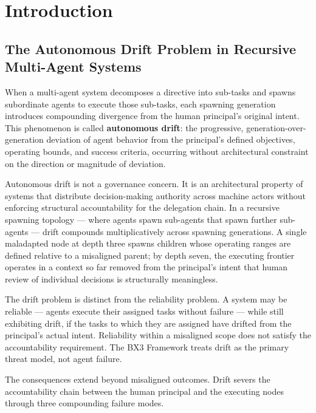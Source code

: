 \section{Introduction}\label{sec:introduction}

\subsection{The Autonomous Drift Problem in Recursive Multi-Agent Systems}

When a multi-agent system decomposes a directive into sub-tasks and spawns subordinate agents to execute those sub-tasks, each spawning generation introduces compounding divergence from the human principal's original intent. This phenomenon is called \textbf{autonomous drift}: the progressive, generation-over-generation deviation of agent behavior from the principal's defined objectives, operating bounds, and success criteria, occurring without architectural constraint on the direction or magnitude of deviation.

Autonomous drift is not a governance concern. It is an architectural property of systems that distribute decision-making authority across machine actors without enforcing structural accountability for the delegation chain. In a recursive spawning topology — where agents spawn sub-agents that spawn further sub-agents — drift compounds multiplicatively across spawning generations. A single maladapted node at depth three spawns children whose operating ranges are defined relative to a misaligned parent; by depth seven, the executing frontier operates in a context so far removed from the principal's intent that human review of individual decisions is structurally meaningless.

The drift problem is distinct from the reliability problem. A system may be reliable — agents execute their assigned tasks without failure — while still exhibiting drift, if the tasks to which they are assigned have drifted from the principal's actual intent. Reliability within a misaligned scope does not satisfy the accountability requirement. The BX3 Framework treats drift as the primary threat model, not agent failure.

The consequences extend beyond misaligned outcomes. Drift severs the accountability chain between the human principal and the executing nodes through three compounding failure modes.

